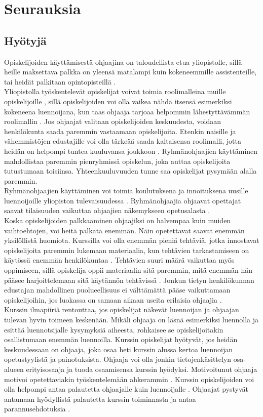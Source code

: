 \documentclass[finnish]{tktltiki2}
\theoremstyle{definition}
\theoremstyle{remark}
\begin{document}
\section{Seurauksia}

\subsection{Hyötyjä}

Opiskelijoiden käyttämisestä ohjaajina on taloudellista etua yliopistolle, sillä heille maksettava palkka on yleensä matalampi kuin kokeneemmille assistenteille, tai heidät palkitaan opintopisteillä \cite{Reges88}.
\\
Yliopistolla työskentelevät opiskelijat voivat toimia roolimalleina muille opiskelijoille \cite{Roberts95, Tashakkori05}, sillä opiskelijoiden voi olla vaikea nähdä itsensä esimerkiksi kokeneena luennoijana, kun taas ohjaaja tarjoaa helpommin lähestyttävämmän roolimallin \cite{Roberts02}. Jos ohjaajat valitaan opiskelijoiden keskuudesta, voidaan henkilökunta saada paremmin vastaamaan opiskelijoita. Etenkin naisille ja vähemmistöjen edustajille voi olla tärkeää saada kaltaisensa roolimalli, jotta heidän on helpompi tuntea kuuluvansa joukkoon \cite{Morgan02}. Ryhmänohjaajien käyttäminen mahdollistaa paremmin pienryhmissä opiskelun, joka auttaa opiskelijoita tutustumaan toisiinsa. Yhteenkuuluvuuden tunne saa opiskelijat pysymään alalla paremmin.
\\
Ryhmänohjaajien käyttäminen voi toimia koulutuksena ja innoituksena uusille luennoijoille yliopiston tulevaisuudessa \cite{Roberts95, Morgan02}. Ryhmänohjaajia ohjaavat opettajat saavat tilaisuuden vaikuttaa ohjaajien näkemykseen opetusalasta \cite{Morgan02}.
\\
Koska opiskelijoiden palkkaaminen ohjaajiksi on halvempaa kuin muiden vaihtoehtojen, voi heitä palkata enemmän. Näin opetettavat saavat enemmän yksilöllistä huomiota. Kurssilla voi olla enemmän pieniä tehtäviä, jotka innostavat opiskelijoita paremmin lukemaan materiaalia, kun tehtävien tarkastamiseen on käytössä enemmän henkilökuntaa \cite{Dickson11}. Tehtävien suuri määrä vaikuttaa myös oppimiseen, sillä opiskelija oppii materiaalin sitä paremmin, mitä enemmän hän pääsee harjoittelemaan sitä käytännön tehtävissä \cite{Vikberg}. Jonkun tietyn henkilökunnan edustajan mahdollinen puolueellisuus ei välttämättä pääse vaikuttamaan opiskelijoihin, jos luokassa on samaan aikaan useita erilaisia ohjaajia \cite{Morgan02}.
\\
Kurssin ilmapiiriä rentouttaa, jos opiskelijat näkevät luennoijan ja ohjaajan tulevan hyvin toimeen keskenään. Mikäli ohjaaja on läsnä esimerkiksi luennolla ja esittää luennotsijalle kysymyksiä aiheesta, rohkaisee se opiskelijoitakin osallistumaan enemmän luennoilla. Kurssin opiskelijat hyötyvät, jos heidän keskuudessaan on ohjaaja, joka osaa heti kurssin alussa kertoa luennoijan opetustyylistä ja painotuksista. Ohjaaja voi olla jonkin tietojenkäsittelyn osa-alueen erityisosaaja ja tuoda osaamisensa kurssin hyödyksi. Motivoitunut ohjaaja motivoi opetettaviakin työskentelemään ahkerammin \cite{Dickson11}. Kurssin opiskelijoiden voi olla helpompi antaa palautetta ohjaajalle kuin luennoijalle \cite{Morgan02}. Ohjaajat pystyvät antamaan hyödyllistä palautetta kurssin toiminnasta ja antaa parannusehdotuksia \cite{Decker06}.
\end{document}
